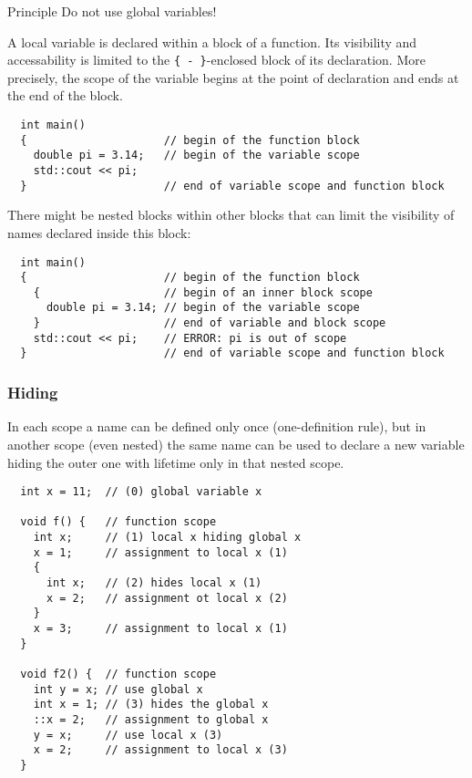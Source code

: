 \begin{guideline}{Principle}
  Do not use global variables!
\end{guideline}

A local variable is declared within a block of a function. Its visibility and accessability is limited to the \texttt{\{ - \}}-enclosed block
of its declaration. More precisely, the scope of the variable begins at the point of declaration and ends at the end of the block.
\begin{verbatim}
  int main()
  {                     // begin of the function block
    double pi = 3.14;   // begin of the variable scope
    std::cout << pi;
  }                     // end of variable scope and function block
\end{verbatim}

There might be nested blocks within other blocks that can limit the visibility of names declared inside this block:
\begin{verbatim}
  int main()
  {                     // begin of the function block
    {                   // begin of an inner block scope
      double pi = 3.14; // begin of the variable scope
    }                   // end of variable and block scope
    std::cout << pi;    // ERROR: pi is out of scope
  }                     // end of variable scope and function block
\end{verbatim}

\subsubsection{Hiding}
In each scope a name can be defined only once (one-definition rule), but in another scope (even nested) the same name can be
used to declare a new variable hiding the outer one with lifetime only in that nested scope.

\begin{verbatim}
  int x = 11;  // (0) global variable x

  void f() {   // function scope
    int x;     // (1) local x hiding global x
    x = 1;     // assignment to local x (1)
    {
      int x;   // (2) hides local x (1)
      x = 2;   // assignment ot local x (2)
    }
    x = 3;     // assignment to local x (1)
  }

  void f2() {  // function scope
    int y = x; // use global x
    int x = 1; // (3) hides the global x
    ::x = 2;   // assignment to global x
    y = x;     // use local x (3)
    x = 2;     // assignment to local x (3)
  }
\end{verbatim}


